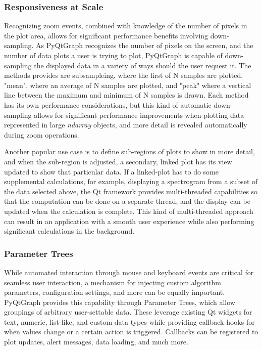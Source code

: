 \documentclass[journal]{vgtc}                %
\begin{document}
\subsubsection{Responsiveness at Scale} %

Recognizing zoom events, combined with knowledge of the number of pixels in the plot area, allows for significant performance benefits involving down-sampling.  As PyQtGraph recognizes the number of pixels on the screen, and the number of data plots a user is trying to plot, PyQtGraph is capable of down-sampling the displayed data in a variety of ways should the user request it.  The methods provides are subsampleing, where the first of N samples are plotted, "mean", where an average of N samples are plotted, and "peak" where a vertical line between the maximum and minimum of N samples is drawn.  Each method has its own performance considerations, but this kind of automatic down-sampling allows for significant performance improvements when plotting data represented in large \emph{ndarray} objects, and more detail is revealed automatically during zoom operations.

Another popular use case is to define sub-regions of plots to show in more detail, and when the sub-region is adjusted, a secondary, linked plot has its view updated to show that particular data.  If a linked-plot has to do some supplemental calculations, for example, displaying a spectrogram from a subset of the data selected above, the Qt framework provides multi-threaded capabilities so that the computation can be done on a separate thread, and the display can be updated when the calculation is complete.  This kind of multi-threaded approach can result in an application with a smooth user experience while also performing significant calculations in the background.

\subsubsection{Parameter Trees}\label{sec:paramtrees}
While automated interaction through mouse and keyboard events are critical for seamless user interaction, a mechanism for injecting custom algorithm parameters, configuration settings, and more can be equally important. PyQtGraph provides this capability through Parameter Trees, which allow groupings of arbitrary user-settable data. These leverage existing Qt widgets for text, numeric, list-like, and custom data types while providing callback hooks for when values change or a certain action is triggered. Callbacks can be registered to plot updates, alert messages, data loading, and much more.
\end{document}
